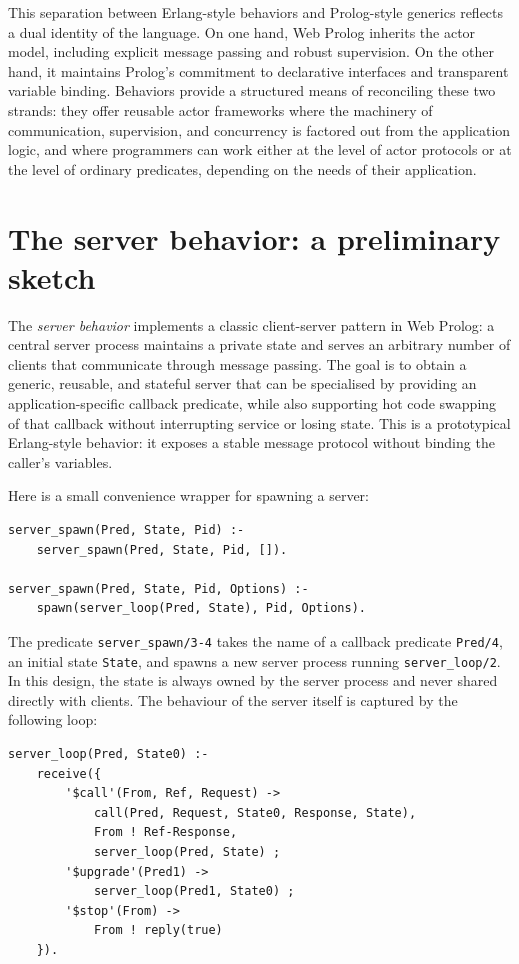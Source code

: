 This separation between Erlang-style behaviors and Prolog-style generics reflects a dual identity of the language. On one hand, Web Prolog inherits the actor model, including explicit message passing and robust supervision. On the other hand, it maintains Prolog's commitment to declarative interfaces and transparent variable binding. Behaviors provide a structured means of reconciling these two strands: they offer reusable actor frameworks where the machinery of communication, supervision, and concurrency is factored out from the application logic, and where programmers can work either at the level of actor protocols or at the level of ordinary predicates, depending on the needs of their application.

\section{The server behavior: a preliminary sketch}\label{sec:a-universal-stateful-server-with-hot-code-swapping}

The \emph{server behavior} implements a classic client-server pattern in Web Prolog: a central server process maintains a private state and serves an arbitrary number of clients that communicate through message passing. The goal is to obtain a generic, reusable, and stateful server that can be specialised by providing an application-specific callback predicate, while also supporting hot code swapping of that callback without interrupting service or losing state. This is a prototypical Erlang-style behavior: it exposes a stable message protocol without binding the caller's variables.

Here is a small convenience wrapper for spawning a server:

\begin{verbatim}
server_spawn(Pred, State, Pid) :-
    server_spawn(Pred, State, Pid, []).

server_spawn(Pred, State, Pid, Options) :-
    spawn(server_loop(Pred, State), Pid, Options).
\end{verbatim}

\noindent The predicate \texttt{server\_spawn/3-4} takes the name of a callback predicate \texttt{Pred/4}, an initial state \texttt{State}, and spawns a new server process running \texttt{server\_loop/2}. In this design, the state is always owned by the server process and never shared directly with clients. The behaviour of the server itself is captured by the following loop:

\begin{verbatim}
server_loop(Pred, State0) :-
    receive({
        '$call'(From, Ref, Request) ->
            call(Pred, Request, State0, Response, State),
            From ! Ref-Response,
            server_loop(Pred, State) ;
        '$upgrade'(Pred1) ->
            server_loop(Pred1, State0) ;
        '$stop'(From) ->
            From ! reply(true)
    }).
\end{verbatim}

